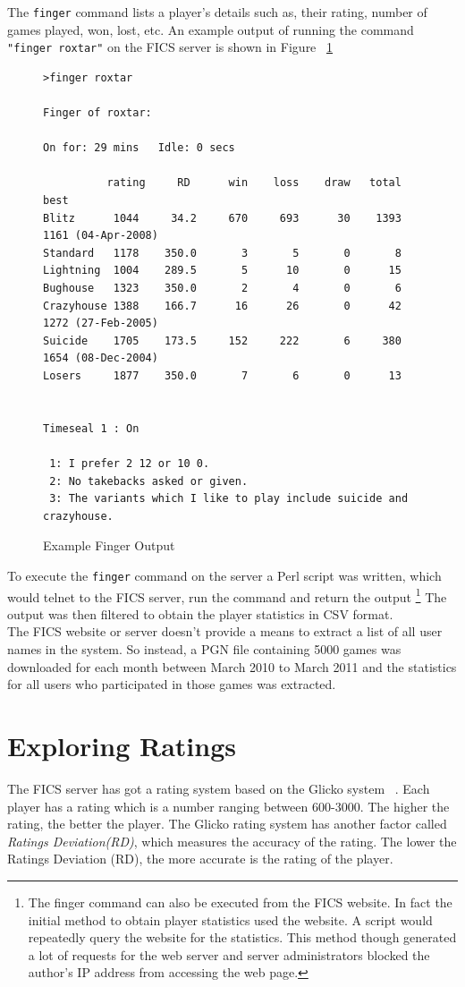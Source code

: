 \documentclass{article}
\begin{document}
The \verb=finger= command lists a player's details such as, their rating, number of games played, won, lost, etc. An example output of running the command \verb="finger roxtar"= on the FICS server is shown in Figure ~\ref{fig:finger}

\begin{figure}[tph]
\begin{verbatim}
>finger roxtar

Finger of roxtar:

On for: 29 mins   Idle: 0 secs

          rating     RD      win    loss    draw   total   best
Blitz      1044     34.2     670     693      30    1393   1161 (04-Apr-2008)
Standard   1178    350.0       3       5       0       8
Lightning  1004    289.5       5      10       0      15
Bughouse   1323    350.0       2       4       0       6
Crazyhouse 1388    166.7      16      26       0      42   1272 (27-Feb-2005)
Suicide    1705    173.5     152     222       6     380   1654 (08-Dec-2004)
Losers     1877    350.0       7       6       0      13


Timeseal 1 : On

 1: I prefer 2 12 or 10 0.
 2: No takebacks asked or given.
 3: The variants which I like to play include suicide and crazyhouse.
\end{verbatim}
\caption{Example Finger Output}
\label{fig:finger}
\end{figure}

\pagebreak

To execute the \verb=finger= command on the server a Perl script was written, which would telnet to the FICS server, run the command and return the output \footnote{The finger command can also be executed from the FICS website. In fact the initial method to obtain player statistics used the website. A script would repeatedly query the website for the statistics. This method though generated a lot of requests for the web server and server administrators blocked the author's IP address from accessing the web page.}  The output was then filtered to obtain the player statistics in CSV format. \\

The FICS website or server doesn't provide a means to extract a list of all user names in the system. So instead, a PGN file containing 5000 games was downloaded for each month between March 2010 to March 2011 and the statistics for all users who participated in those games was extracted. 

\section{Exploring Ratings}
The FICS server has got a rating system based on the Glicko system ~\cite{spec:glicko}. Each player has a rating which is a number ranging between 600-3000. The higher the rating, the better the player. The Glicko rating system has another factor called \textsl{Ratings Deviation(RD)}, which measures the accuracy of the rating. The lower the Ratings Deviation (RD), the more accurate is the rating of the player.\\
\end{document}
